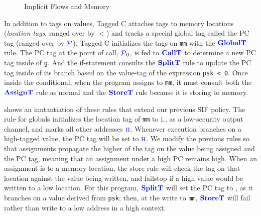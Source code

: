 \documentclass{llncs}
\begin{document}
\begin{figure}
\caption{Implicit Flows and Memory}
\label{fig:ex2}
\end{figure}

In addition to tags on values, Tagged C attaches tags to memory locations ({\em location tags}, ranged over by
\(\lt\)) and tracks a special global tag called the PC tag (ranged over by \(\mathcal{\color{blue} P\mathit{}}\)).
Tagged C initializes the tags on {\tt mm} with the \(\color{blue} \mathbf{GlobalT}\) rule. The PC tag
at the point of call, \(\mathcal{\color{blue} P\mathit{}}_0\), is fed to \(\color{blue} \mathbf{CallT}\) to determine a new PC tag
inside of {\tt g}. And the if-statement consults the \(\color{blue} \mathbf{SplitT}\) rule to update the PC tag
inside of its branch based on the value-tag of the expression {\tt psk < 0}. Once inside the
conditional, when the program assigns to {\tt mm}, it must consult both the
\(\color{blue} \mathbf{AssignT}\) rule as normal and the \(\color{blue} \mathbf{StoreT}\) rule because it is storing
to memory.

 shows an inntantiation of these rules that extend our previous SIF policy.
The rule for globals initializes the location tag of {\tt mm} to \(\textnormal{\color{blue} \sc l}\),
as a low-security output channel, and marks all other addresses \(\textnormal{\color{blue} \sc h}\). Whenever execution branches on
a high-tagged value, the PC tag will be set to \(\textnormal{\color{blue} \sc h}\). We modify the previous rules so that
assignments propagate the higher of the tag on the value being assigned and the PC tag, meaning that an
assignment under a high PC remains high.
When an assignment is to a memory location, the store rule will check the tag on
that location against the value being written, 
and failstop if a high value would be written to a low location.
For this program, \(\color{blue} \mathbf{SplitT}\) will set the PC tag to \high, as it branches on a value derived from {\tt psk}; 
then, at the write to {\tt mm}, \(\color{blue} \mathbf{StoreT}\) will fail rather than write to a low address
in a high context.
\end{document}
